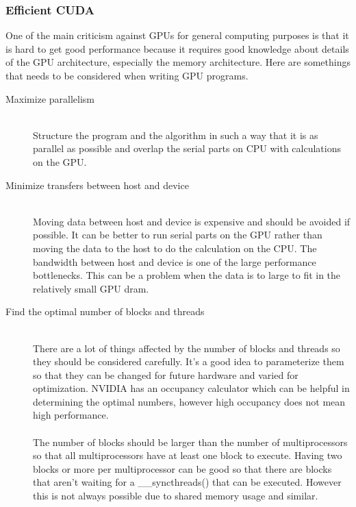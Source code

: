 \documentclass[10pt,a4paper]{article}
\begin{document}
\subsubsection{Efficient CUDA}
One of the main criticism against GPUs for general computing purposes is that it is hard to get good performance because it requires good knowledge about details of the GPU architecture, especially the memory architecture. Here are somethings that needs to be considered when writing GPU programs.\cite{plink_gpu, cuda, cuda_best_practice}
\\
\begin{description}
  \item[Maximize parallelism] \hfill \\
  Structure the program and the algorithm in such a way that it is as parallel as possible and overlap the serial parts on CPU with calculations on the GPU.\cite{plink_gpu, cuda}
  \item[Minimize transfers between host and device] \hfill \\
  Moving data between host and device is expensive and should be avoided if possible. It can be better to run serial parts on the GPU rather than moving the data to the host to do the calculation on the CPU. The bandwidth between host and device is one of the large performance bottlenecks. This can be a problem when the data is to large to fit in the relatively small GPU dram.\cite{cuda, cuda_best_practice}
  \item[Find the optimal number of blocks and threads] \hfill \\
  There are a lot of things affected by the number of blocks and threads so they should be considered carefully. It's a good idea to parameterize them so that they can be changed for future hardware and varied for optimization. NVIDIA has an occupancy calculator which can be helpful in determining the optimal numbers, however high occupancy does not mean high performance.\cite{cuda, cuda_best_practice}\\
  \\
  The number of blocks should be larger than the number of multiprocessors so that all multiprocessors have at least one block to execute. Having two blocks or more per multiprocessor can be good so that there are blocks that aren't waiting for a \_\_syncthreads() that can be executed. However this is not always possible due to shared memory usage and similar.\cite{cuda_best_practice}\\
  \\  

\end{description}
\end{document}
